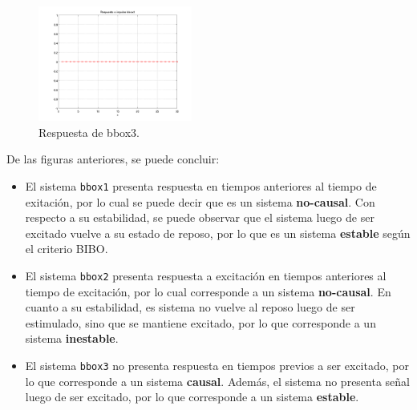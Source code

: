 \documentclass[10pt,conference,a4paper]{IEEEtran}
\begin{document}
\begin{figure}[H]
  \centering
  \includegraphics[width=0.45\textwidth]{../img/img9.png}
  \caption{Respuesta de bbox3.}
  \label{fig:img9}
\end{figure}

De las figuras anteriores, se puede concluir:

\begin{itemize}
 \item El sistema \verb|bbox1| presenta respuesta en tiempos anteriores al 
tiempo de exitaci\'on, por lo cual se puede decir que es un sistema 
\textbf{no-causal}. Con respecto a su estabilidad, se puede observar que el 
sistema luego de ser excitado vuelve a su estado de reposo, por lo que es un 
sistema \textbf{estable} seg\'un el criterio BIBO.
 \item El sistema \verb|bbox2| presenta respuesta a excitaci\'on en tiempos 
anteriores al tiempo de excitaci\'on, por lo cual corresponde a un sistema 
\textbf{no-causal}. En cuanto a su estabilidad, es sistema no vuelve al reposo 
luego de ser estimulado, sino que se mantiene excitado, por lo que corresponde 
a un sistema \textbf{inestable}.
 \item El sistema \verb|bbox3| no presenta respuesta en tiempos previos a ser 
excitado, por lo que corresponde a un sistema \textbf{causal}. Adem\'as, el 
sistema no presenta se\~nal luego de ser excitado, por lo que corresponde a un 
sistema \textbf{estable}.
\end{itemize}
\end{document}
